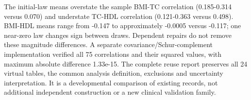 \documentclass[11pt,letterpaper]{article}
\begin{document}
\endgroup

The initial-law means overstate the sample BMI-TC correlation (0.185-0.314 versus 0.070) and understate TC-HDL correlation (0.121-0.363 versus 0.498). BMI-HDL means range from -0.147 to approximately -0.0005 versus -0.117; one near-zero law changes sign between draws. Dependent repairs do not remove these magnitude differences. A separate covariance/\allowbreak{}Schur-complement implementation verified all 75 correlations and their squared values, with maximum absolute difference 1.33e-15. The complete reuse report preserves all 24 virtual tables, the common analysis definition, exclusions and uncertainty interpretation. It is a developmental comparison of existing records, not additional independent construction or a new clinical validation family.
\end{document}
